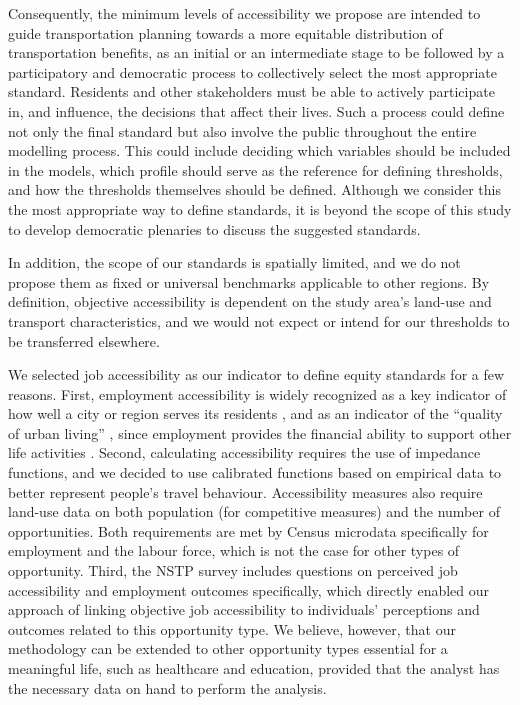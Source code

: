 \documentclass[preprint, 3p,
authoryear]{elsarticle} %
\begin{document}
Consequently, the minimum levels of accessibility we propose are
intended to guide transportation planning towards a more equitable
distribution of transportation benefits, as an initial or an
intermediate stage to be followed by a participatory and democratic
process to collectively select the most appropriate standard. Residents
and other stakeholders must be able to actively participate in, and
influence, the decisions that affect their lives. Such a process could
define not only the final standard but also involve the public
throughout the entire modelling process. This could include deciding
which variables should be included in the models, which profile should
serve as the reference for defining thresholds, and how the thresholds
themselves should be defined. Although we consider this the most
appropriate way to define standards, it is beyond the scope of this
study to develop democratic plenaries to discuss the suggested
standards.

In addition, the scope of our standards is spatially limited, and we do
not propose them as fixed or universal benchmarks applicable to other
regions. By definition, objective accessibility is dependent on the
study area's land-use and transport characteristics, and we would not
expect or intend for our thresholds to be transferred elsewhere.

We selected job accessibility as our indicator to define equity
standards for a few reasons. First, employment accessibility is widely
recognized as a key indicator of how well a city or region serves its
residents \citep{bania2008, owen2015, shen1998}, and as an indicator of
the ``quality of urban living'' \citep{wachs1973, handy2020}, since
employment provides the financial ability to support other life
activities \citep{merlin2017}. Second, calculating accessibility
requires the use of impedance functions, and we decided to use
calibrated functions based on empirical data to better represent
people's travel behaviour. Accessibility measures also require land-use
data on both population (for competitive measures) and the number of
opportunities. Both requirements are met by Census microdata
specifically for employment and the labour force, which is not the case
for other types of opportunity. Third, the NSTP survey includes
questions on perceived job accessibility and employment outcomes
specifically, which directly enabled our approach of linking objective
job accessibility to individuals' perceptions and outcomes related to
this opportunity type. We believe, however, that our methodology can be
extended to other opportunity types essential for a meaningful life,
such as healthcare and education, provided that the analyst has the
necessary data on hand to perform the analysis.
\end{document}

